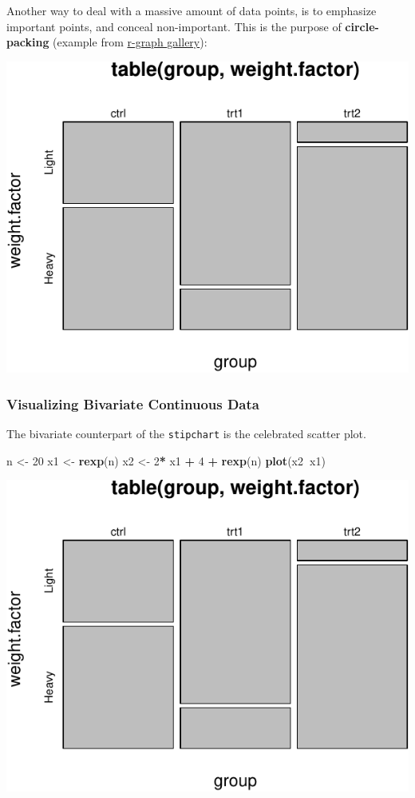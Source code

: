 \documentclass[]{book}
\newenvironment{Shaded}{\begin{snugshade}}{\end{snugshade}}
\newcommand{\KeywordTok}[1]{\textcolor[rgb]{0.13,0.29,0.53}{\textbf{#1}}}
\newcommand{\DecValTok}[1]{\textcolor[rgb]{0.00,0.00,0.81}{#1}}
\newcommand{\StringTok}[1]{\textcolor[rgb]{0.31,0.60,0.02}{#1}}
\newcommand{\OperatorTok}[1]{\textcolor[rgb]{0.81,0.36,0.00}{\textbf{#1}}}
\newcommand{\NormalTok}[1]{#1}
\theoremstyle{definition}
\theoremstyle{definition}
\theoremstyle{definition}
\theoremstyle{remark}
\begin{document}
Another way to deal with a massive amount of data points, is to
emphasize important points, and conceal non-important. This is the
purpose of \textbf{circle-packing} (example from
\href{https://www.r-graph-gallery.com/308-interactive-circle-packing/}{r-graph
gallery}):

\includegraphics[width=0.5\linewidth]{Rcourse_files/figure-latex/unnamed-chunk-137-1}

\subsubsection{Visualizing Bivariate Continuous
Data}\label{visualizing-bivariate-continuous-data}

The bivariate counterpart of the \texttt{stipchart} is the celebrated
scatter plot.

\begin{Shaded}
\begin{Highlighting}[]
\NormalTok{n <-}\StringTok{ }\DecValTok{20}
\NormalTok{x1 <-}\StringTok{ }\KeywordTok{rexp}\NormalTok{(n)}
\NormalTok{x2 <-}\StringTok{ }\DecValTok{2}\OperatorTok{*}\StringTok{ }\NormalTok{x1 }\OperatorTok{+}\StringTok{ }\DecValTok{4} \OperatorTok{+}\StringTok{ }\KeywordTok{rexp}\NormalTok{(n)}
\KeywordTok{plot}\NormalTok{(x2}\OperatorTok{~}\NormalTok{x1)}
\end{Highlighting}
\end{Shaded}

\includegraphics[width=0.5\linewidth]{Rcourse_files/figure-latex/unnamed-chunk-138-1}
\end{document}
